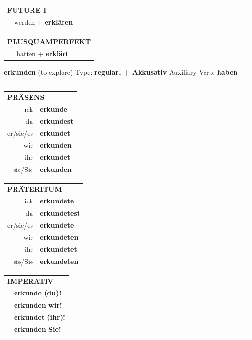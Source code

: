 \documentclass[10pt,a4paper]{revtex4-2}
\begin{document}
\begin{verbbox-dat}
\begin{tabular}{rl}
    \multicolumn{2}{l}{\textbf{FUTURE I} }\\
  &  werden + \textbf{erklären}\\
 
  \end{tabular}
\hfill
   \begin{tabular}{rl}
      \multicolumn{2}{l}{\textbf{PLUSQUAMPERFEKT}}\\
  &  hatten + \textbf{erklärt}\\
  \end{tabular}
  
  \vspace{-5pt}


\end{verbbox-dat}
\begin{verbbox-acc}
{\Large \bf erkunden} (to explore) \hfill Type: \textbf{regular, + Akkusativ} \hfill Auxiliary Verb: \textbf{haben}

\vspace{5pt}
\hrule
\vspace{5pt}

\begin{tabular}{rl}
\multicolumn{2}{l}{\textbf{PRÄSENS}}\\
ich & \textbf{erkunde}\\
du & \textbf{erkundest}\\
er/sie/es & \textbf{erkundet}\\
wir & \textbf{erkunden}\\
ihr & \textbf{erkundet}\\
sie/Sie & \textbf{erkunden}\\
\end{tabular}
\hfill
\begin{tabular}{rl}
\multicolumn{2}{l}{\textbf{PRÄTERITUM}}\\
ich & \textbf{erkundete}\\
du & \textbf{erkundetest}\\
er/sie/es & \textbf{erkundete}\\
wir & \textbf{erkundeten}\\
ihr & \textbf{erkundetet}\\
sie/Sie & \textbf{erkundeten}\\
\end{tabular}
\hfill
\begin{tabular}{rl}
\multicolumn{2}{l}{\textbf{IMPERATIV}}\\
& \textbf{erkunde (du)!}\\
& \textbf{erkunden wir!}\\
& \textbf{erkundet (ihr)!}\\
& \textbf{erkunden Sie!}\\
\end{tabular}


\end{verbbox-acc}
\end{document}
